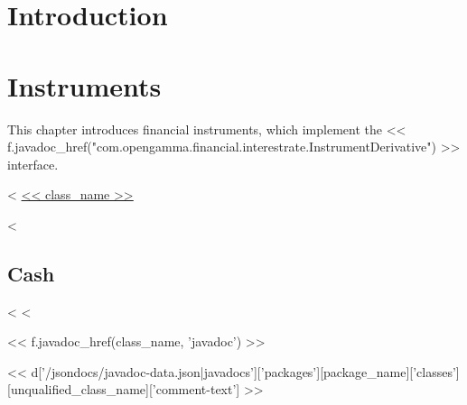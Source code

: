\chapter{Introduction}

\chapter{Instruments}

This chapter introduces financial instruments, which implement the << f.javadoc_href("com.opengamma.financial.interestrate.InstrumentDerivative") >> interface.

<%
\hyperref[sec:<< class_name >>]{<< class_name >>}

<%

\section{Cash}
<%
\label{sec:<< class_name >>}
<%

<< f.javadoc_href(class_name, 'javadoc') >>

<< d['/jsondocs/javadoc-data.json|javadocs']['packages'][package_name]['classes'][unqualified_class_name]['comment-text'] >>

